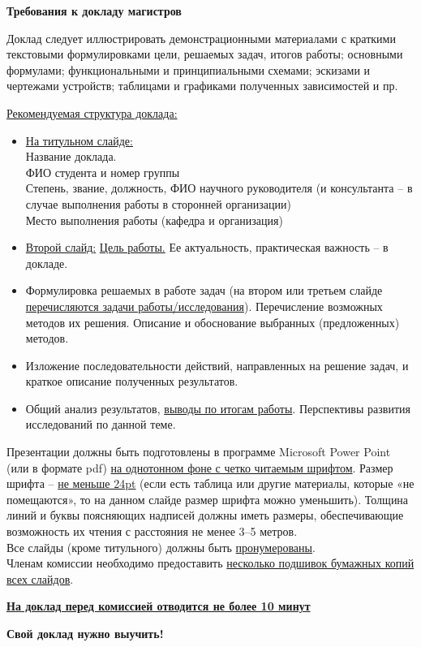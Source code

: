\documentclass{report}
\begin{document}
\pagestyle{empty}

\begin{center}
\textbf{\large Требования к докладу магистров}
\end{center}

Доклад следует иллюстрировать демонстрационными материалами с краткими текстовыми формулировками цели, решаемых задач, итогов работы; основными формулами; функциональными и принципиальными схемами; эскизами и чертежами устройств; таблицами и графиками полученных зависимостей и пр. 

\uline{Рекомендуемая структура доклада:}
\begin{itemize}

\item \uline{На титульном слайде:}\\
Название доклада.\\
ФИО студента и номер группы\\
Степень, звание, должность, ФИО научного руководителя (и консультанта -- в случае выполнения работы в сторонней организации)\\
Место выполнения работы (кафедра и организация)

\item \uline{Второй слайд:} \uline{Цель работы.} Ее актуальность, практическая важность -- в докладе.

\item Формулировка решаемых в работе задач (на втором или третьем слайде \uline{перечисляются задачи работы/исследования}). Перечисление возможных методов их решения. Описание и обоснование выбранных (предложенных) методов.

\item Изложение последовательности действий, направленных на решение задач, и краткое описание полученных результатов.

\item Общий анализ результатов, \uline{выводы по итогам работы}. Перспективы развития исследований по данной теме.

\end{itemize}
Презентации должны быть подготовлены в программе Microsoft Power Point (или в формате pdf) \uline{на однотонном фоне с четко читаемым шрифтом}. Размер шрифта -- \uline{не меньше 24pt} (если есть таблица или другие материалы, которые «не помещаются», то на данном слайде размер шрифта можно уменьшить). Толщина линий и буквы поясняющих надписей должны иметь размеры, обеспечивающие возможность их чтения с расстояния не менее 3–5 метров.\\
Все слайды (кроме титульного) должны быть \uline{пронумерованы}.\\
Членам комиссии необходимо предоставить \uline{несколько подшивок бумажных копий всех слайдов}.\\

\begin{center}
\textbf{\uline{На доклад перед комиссией отводится не более 10 минут}}\\
\end{center}
\begin{center}
\textbf{Свой доклад нужно выучить!}
\end{center}
\end{document}
